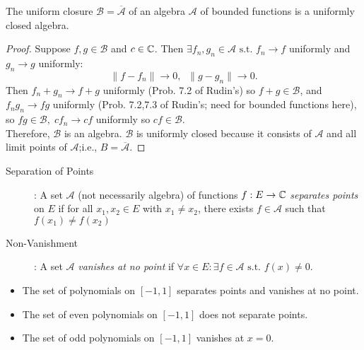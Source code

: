 \begin{thm}[29]
	The uniform closure $\mathscr{B}=\mathbf{\overline{\mathscr{A}}}$ of an algebra $\mathscr{A}$ of bounded functions is a uniformly closed algebra.
	\begin{proof}
		Suppose $f,g \in \mathscr{B}$ and $c \in \mathbb{C}$. Then $\exists{f_{n},g_{n} \in \mathscr{A}} \text{ s.t. } f_{n}\to f$ uniformly and $g_{n}\to g$ uniformly:
		\[
			\|f-f_{n}\|	\to 0, \;\; \|g-g_{n}\|\to 0
			.\]
		Then $f_{n}+g_{n}\to f+g$ uniformly (Prob. 7.2 of Rudin's) so $f+g \in \mathscr{B}$, and $f_{n} g_{n} \to fg$ uniformly (Prob. 7.2,7.3 of Rudin's; need for bounded functions here), so $fg \in \mathscr{B},\; c f_n \to cf$ uniformly so $cf \in \mathscr{B}$.\\
		Therefore, $\mathscr{B}$ is an algebra.
		$\mathscr{B}$ is uniformly closed because it consists of $\mathscr{A}$ and all limit points of $\mathscr{A}$;i.e., $B=\overline{\mathscr{A}}$.
	\end{proof}
\end{thm}

\begin{define}[30]
	\hfill
	\begin{description}
		\item[Separation of Points]: A set $\mathscr{A}$ (not necessarily algebra) of functions $f:E\to \mathbb{C}$ \textit{separates points}  on $E$ if for all $x_1,x_2 \in E$ with $x_1\neq x_2$, there exists $f \in \mathscr{A}$ such that $f(x_1)\neq f(x_2)$
		\item[Non-Vanishment]: A set $\mathscr{A}$ \textit{vanishes at no point} if  $\forall{x \in E}: \exists{f \in \mathscr{A}} \text{ s.t. } f(x)\neq 0$.
	\end{description}
	\hfill
	\begin{example}
		\begin{itemize}
			\item The set of polynomials  on $[-1,1]$ separates points and vanishes at no point.
			\item The set of even polynomials on $[-1,1]$ does not separate points.
			\item The set of odd polynomials on $[-1,1]$ vanishes at $x=0$.
		\end{itemize}
	\end{example}
\end{define}


